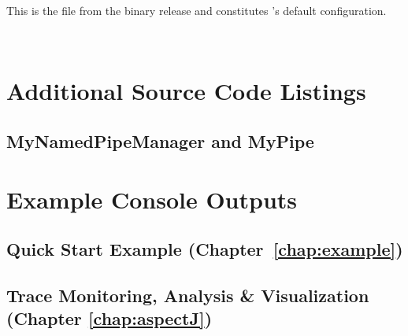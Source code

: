 This is the file \file{\monitoringPropertiesFile} from the binary release and 
constitutes \KiekerMonitoringPart{}'s default configuration.

\

\setXMLListing


\chapter{Additional Source Code Listings}
\section{MyNamedPipeManager and MyPipe}\label{appendix:pipeListings}
      \setJavaCodeListing
      
\newpage
      \setJavaCodeListing
      

\chapter{Example Console Outputs}

\section{Quick Start Example (Chapter~\ref{chap:example})}\label{sec:appendix:manualInstrumentation:output}

\newpage

\newpage	
\section{Trace Monitoring, Analysis \& Visualization (Chapter \ref{chap:aspectJ})}

	

